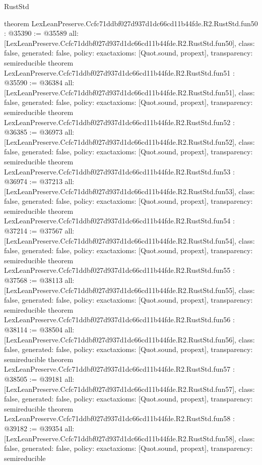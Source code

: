 \begin{lexlean}{RustStd}
\begin{coremodule}
{}
theorem LexLeanPreserve.Ccfc71ddbf027d937d1dc66cd11b44fde.R2.RustStd.fun50 : @35390 := @35589 {
  all: [LexLeanPreserve.Ccfc71ddbf027d937d1dc66cd11b44fde.R2.RustStd.fun50],
  class: false,
  generated: false,
  policy: exact{axioms: [Quot.sound, propext]},
  transparency: semireducible
}
theorem LexLeanPreserve.Ccfc71ddbf027d937d1dc66cd11b44fde.R2.RustStd.fun51 : @35590 := @36384 {
  all: [LexLeanPreserve.Ccfc71ddbf027d937d1dc66cd11b44fde.R2.RustStd.fun51],
  class: false,
  generated: false,
  policy: exact{axioms: [Quot.sound, propext]},
  transparency: semireducible
}
theorem LexLeanPreserve.Ccfc71ddbf027d937d1dc66cd11b44fde.R2.RustStd.fun52 : @36385 := @36973 {
  all: [LexLeanPreserve.Ccfc71ddbf027d937d1dc66cd11b44fde.R2.RustStd.fun52],
  class: false,
  generated: false,
  policy: exact{axioms: [Quot.sound, propext]},
  transparency: semireducible
}
theorem LexLeanPreserve.Ccfc71ddbf027d937d1dc66cd11b44fde.R2.RustStd.fun53 : @36974 := @37213 {
  all: [LexLeanPreserve.Ccfc71ddbf027d937d1dc66cd11b44fde.R2.RustStd.fun53],
  class: false,
  generated: false,
  policy: exact{axioms: [Quot.sound, propext]},
  transparency: semireducible
}
theorem LexLeanPreserve.Ccfc71ddbf027d937d1dc66cd11b44fde.R2.RustStd.fun54 : @37214 := @37567 {
  all: [LexLeanPreserve.Ccfc71ddbf027d937d1dc66cd11b44fde.R2.RustStd.fun54],
  class: false,
  generated: false,
  policy: exact{axioms: [Quot.sound, propext]},
  transparency: semireducible
}
theorem LexLeanPreserve.Ccfc71ddbf027d937d1dc66cd11b44fde.R2.RustStd.fun55 : @37568 := @38113 {
  all: [LexLeanPreserve.Ccfc71ddbf027d937d1dc66cd11b44fde.R2.RustStd.fun55],
  class: false,
  generated: false,
  policy: exact{axioms: [Quot.sound, propext]},
  transparency: semireducible
}
theorem LexLeanPreserve.Ccfc71ddbf027d937d1dc66cd11b44fde.R2.RustStd.fun56 : @38114 := @38504 {
  all: [LexLeanPreserve.Ccfc71ddbf027d937d1dc66cd11b44fde.R2.RustStd.fun56],
  class: false,
  generated: false,
  policy: exact{axioms: [Quot.sound, propext]},
  transparency: semireducible
}
theorem LexLeanPreserve.Ccfc71ddbf027d937d1dc66cd11b44fde.R2.RustStd.fun57 : @38505 := @39181 {
  all: [LexLeanPreserve.Ccfc71ddbf027d937d1dc66cd11b44fde.R2.RustStd.fun57],
  class: false,
  generated: false,
  policy: exact{axioms: [Quot.sound, propext]},
  transparency: semireducible
}
theorem LexLeanPreserve.Ccfc71ddbf027d937d1dc66cd11b44fde.R2.RustStd.fun58 : @39182 := @39354 {
  all: [LexLeanPreserve.Ccfc71ddbf027d937d1dc66cd11b44fde.R2.RustStd.fun58],
  class: false,
  generated: false,
  policy: exact{axioms: [Quot.sound, propext]},
  transparency: semireducible
}
\end{coremodule}
\end{lexlean}
